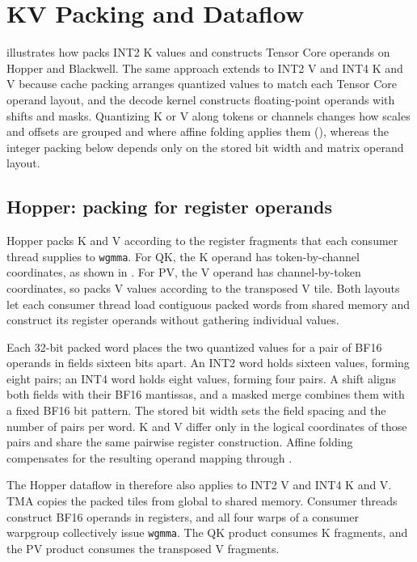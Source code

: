 \appendix
{}

\section{KV Packing and Dataflow}
\label{sec:operand-construction}

 illustrates how \sys{} packs INT2 K values and constructs Tensor Core operands on Hopper and Blackwell.
The same approach extends to INT2 V and INT4 K and V because cache packing arranges quantized values to match each Tensor Core operand layout, and the decode kernel constructs floating-point operands with shifts and masks.
Quantizing K or V along tokens or channels changes how scales and offsets are grouped and where affine folding applies them (), whereas the integer packing below depends only on the stored bit width and matrix operand layout.

\subsection{Hopper: packing for register operands}

Hopper packs K and V according to the register fragments that each consumer thread supplies to \texttt{wgmma}.
For QK, the K operand has token-by-channel coordinates, as shown in .
For PV, the V operand has channel-by-token coordinates, so \sys{} packs V values according to the transposed V tile.
Both layouts let each consumer thread load contiguous packed words from shared memory and construct its register operands without gathering individual values.

Each 32-bit packed word places the two quantized values for a pair of BF16 operands in fields sixteen bits apart.
An INT2 word holds sixteen values, forming eight pairs; an INT4 word holds eight values, forming four pairs.
A shift aligns both fields with their BF16 mantissas, and a masked merge combines them with a fixed BF16 bit pattern.
The stored bit width sets the field spacing and the number of pairs per word.
K and V differ only in the logical coordinates of those pairs and share the same pairwise register construction.
Affine folding compensates for the resulting operand mapping through .

The Hopper dataflow in  therefore also applies to INT2 V and INT4 K and V.
TMA copies the packed tiles from global to shared memory.
Consumer threads construct BF16 operands in registers, and all four warps of a consumer warpgroup collectively issue \texttt{wgmma}.
The QK product consumes K fragments, and the PV product consumes the transposed V fragments.

